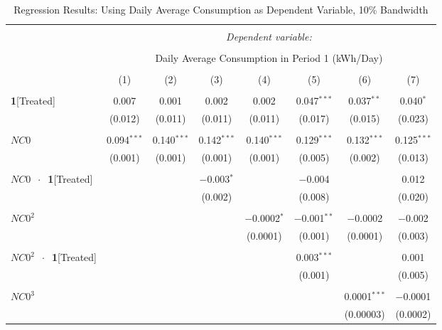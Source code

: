 \begin{table}[!htbp]
\centering 
\caption{Regression Results: Using Daily Average Consumption as Dependent Variable, 10\% Bandwidth}\label{Table:Regression-Results_Daily-Average_10P-BW} 
\small 
\begin{adjustbox}{scale = 0.65}
\begin{tabular}{@{\extracolsep{50pt}}lccccccc} 
\\[-1.8ex]\hline 
\hline \\[-1.8ex] 
 & \multicolumn{7}{c}{\textit{Dependent variable:}} \\ 
\cline{2-8} 
\\[-1.8ex] & \multicolumn{7}{c}{Daily Average Consumption in Period 1 (kWh/Day)} \\ 
\\[-1.8ex] & (1) & (2) & (3) & (4) & (5) & (6) & (7)\\ 
\hline \\[-1.8ex] 
 \textbf{1}[Treated] & 0.007 & 0.001 & 0.002 & 0.002 & 0.047$^{***}$ & 0.037$^{**}$ & 0.040$^{*}$ \\ 
  & (0.012) & (0.011) & (0.011) & (0.011) & (0.017) & (0.015) & (0.023) \\ 
  & & & & & & & \\ 
 $NC0$ & 0.094$^{***}$ & 0.140$^{***}$ & 0.142$^{***}$ & 0.140$^{***}$ & 0.129$^{***}$ & 0.132$^{***}$ & 0.125$^{***}$ \\ 
  & (0.001) & (0.001) & (0.001) & (0.001) & (0.005) & (0.002) & (0.013) \\ 
  & & & & & & & \\ 
 $NC0$ $\ \cdot \ $ \textbf{1}[Treated] &  &  & $-$0.003$^{*}$ &  & $-$0.004 &  & 0.012 \\ 
  &  &  & (0.002) &  & (0.008) &  & (0.020) \\ 
  & & & & & & & \\ 
 $NC0^{2}$ &  &  &  & $-$0.0002$^{*}$ & $-$0.001$^{**}$ & $-$0.0002 & $-$0.002 \\ 
  &  &  &  & (0.0001) & (0.001) & (0.0001) & (0.003) \\ 
  & & & & & & & \\ 
 $NC0^{2}$ $\ \cdot \ $ \textbf{1}[Treated] &  &  &  &  & 0.003$^{***}$ &  & 0.001 \\ 
  &  &  &  &  & (0.001) &  & (0.005) \\ 
  & & & & & & & \\ 
 $NC0^{3}$ &  &  &  &  &  & 0.0001$^{***}$ & $-$0.0001 \\ 
  &  &  &  &  &  & (0.00003) & (0.0002) \\ 

\end{tabular}
\end{adjustbox}
\end{table}
